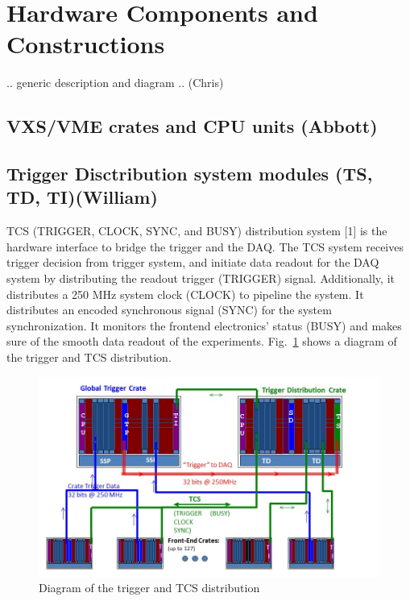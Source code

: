 \section{Hardware Components and Constructions}

.. generic description and diagram .. (Chris)

\subsection{VXS/VME crates and CPU units (Abbott)}

\subsection{Trigger Disctribution system modules (TS, TD, TI)(William)}
	
TCS (TRIGGER, CLOCK, SYNC, and BUSY) distribution system [1] is the hardware interface to bridge the trigger and the DAQ.  The TCS system receives trigger decision from trigger system, and initiate data readout for the DAQ system by distributing the readout trigger (TRIGGER) signal.  Additionally, it distributes a 250 MHz system clock (CLOCK) to pipeline the system.  It distributes an encoded synchronous signal (SYNC) for the system synchronization.  It monitors the frontend electronics’ status (BUSY) and makes sure of the smooth data readout of the experiments. Fig.~\ref{fig:TCSdiagram} shows a diagram of the trigger and TCS distribution.

\begin{figure}[hbt]
	\centering
	\includegraphics[width=1.0\columnwidth,keepaspectratio]{img/TCSdiagram.jpg}
	\caption{Diagram of the trigger and TCS distribution}
	\label{fig:TCSdiagram}
\end{figure}


